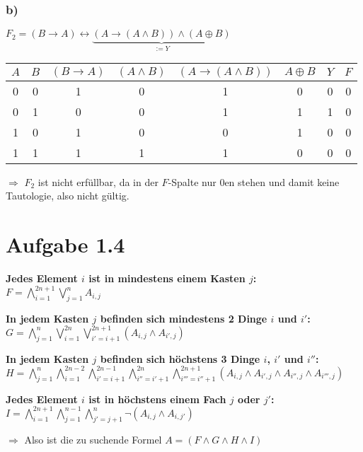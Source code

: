 \documentclass[a4paper,12pt]{article}
\begin{document}
	\subsubsection*{b)}
	\begin{center}
		$F_2 = \left( B \rightarrow A \right) \leftrightarrow \underbrace{\left( A \rightarrow \left( A \wedge B \right) \right) \wedge \left( A \oplus B \right)}_{:= Y}$
	\end{center}
	\begin{table}[H]
		\centering
		\begin{tabular}{c|c|c|c|c|c|c|c}
			$A$ & $B$ & $\left( B \rightarrow A\right)$ & $\left( A \wedge B\right)$ & $\left( A \rightarrow \left( A \wedge B\right)\right)$ & $A \oplus B$ & $Y$ & $F$\\ \hline
			0 & 0 & 1 & 0 & 1 & 0 & 0 & 0 \\
			0 & 1 & 0 & 0 & 1 & 1 & 1 & 0 \\
			1 & 0 & 1 & 0 & 0 & 1 & 0 & 0 \\
			1 & 1 & 1 & 1 & 1 & 0 & 0 & 0
		\end{tabular}
	\end{table}
	\begin{center}
		$\Rightarrow$ $F_2$ ist nicht erfüllbar, da in der $F$-Spalte nur 0en stehen und damit keine Tautologie, also nicht gültig.
	\end{center}
	\newpage
	
	\section*{Aufgabe 1.4}
	\begin{center}
		\textbf{Jedes Element $i$ ist in mindestens einem Kasten $j$:}\\
		$F = \bigwedge \limits_{i = 1}^{2n+1} \bigvee \limits_{j = 1} ^{n} A_{i,j}$
	\end{center}
	\begin{center}
		\textbf{In jedem Kasten $j$ befinden sich mindestens 2 Dinge $i$ und $i'$:}\\
		$G = \bigwedge \limits_{j = 1}^{n} \bigvee \limits_{i = 1} ^{2n} \bigvee \limits_{i' = i+1} ^{2n+1} \left( A_{i,j} \wedge A_{i',j} \right)$
	\end{center}
	\begin{center}
		\textbf{In jedem Kasten $j$ befinden sich höchstens 3 Dinge $i$, $i'$ und $i''$:}
		$H = \bigwedge \limits_{j = 1}^{n} \bigwedge \limits_{i = 1} ^{2n-2} \bigwedge \limits_{i' = i+1} ^{2n-1} \bigwedge \limits_{i'' = i'+1} ^{2n} \bigwedge \limits_{i''' = i''+1} ^{2n+1} \left( A_{i,j} \wedge A_{i',j} \wedge A_{i'',j} \wedge A_{i''',j}\right)$
	\end{center}
	\begin{center}
		\textbf{Jedes Element $i$ ist in höchstens einem Fach $j$ oder $j'$:}
		$I = \bigwedge \limits_{i = 1}^{2n+1} \bigwedge \limits_{j = 1} ^{n-1} \bigwedge \limits_{j'=j+1} ^{n} \lnot \left( A_{i,j} \wedge A_{i,j'} \right)$
	\end{center}
	\begin{center}
		$\Rightarrow$ Also ist die zu suchende Formel $A = \left( F \wedge G \wedge H \wedge I \right)$
	\end{center}
	
\end{document}
